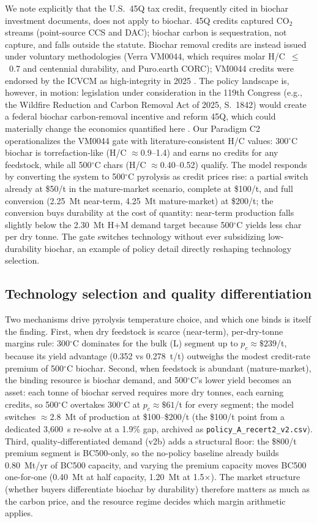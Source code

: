 We note explicitly that the U.S.~45Q tax credit, frequently cited in biochar
investment documents, does not apply to biochar. 45Q credits captured
CO$_2$ streams (point-source CCS and DAC); biochar carbon is sequestration, not
capture, and falls outside the statute. Biochar removal credits are instead
issued under voluntary methodologies (Verra VM0044, which requires molar
H/C~$\le$~0.7 and centennial durability, and Puro.earth CORC); VM0044 credits
were endorsed by the ICVCM as high-integrity in 2025 \cite{icvcm2025}. The
policy landscape is, however, in motion: legislation under consideration in the
119th Congress (e.g., the Wildfire Reduction and Carbon Removal Act of 2025,
S.~1842) would create a federal biochar carbon-removal incentive and reform
45Q, which could materially change the economics quantified here
\cite{wrca2025}. Our Paradigm C2 operationalizes the VM0044 gate with
literature-consistent H/C values: 300$^\circ$C biochar is torrefaction-like
(H/C $\approx$0.9--1.4) and earns no credits for any feedstock, while
all 500$^\circ$C chars (H/C $\approx$0.40--0.52) qualify. The model responds
by converting the system to 500$^\circ$C pyrolysis as credit prices rise: a
partial switch already at \$50/t in the mature-market scenario, complete at
\$100/t, and full conversion (2.25~Mt near-term, 4.25~Mt
mature-market) at \$200/t; the conversion
buys durability at the cost of quantity: near-term production falls slightly
below the 2.30~Mt H+M demand target because 500$^\circ$C yields less char per
dry tonne. The gate switches technology without ever subsidizing
low-durability biochar, an example of
policy detail directly reshaping technology selection.

\subsection{Technology selection and quality differentiation}

Two mechanisms drive pyrolysis temperature choice, and which one binds is
itself the finding. First, when dry feedstock is scarce (near-term), per-dry-tonne
margins rule: 300$^\circ$C dominates for the bulk (L) segment up to
$p_c\approx\$239$/t, because its yield advantage (0.352 vs 0.278~t/t)
outweighs the modest credit-rate premium of 500$^\circ$C biochar. Second, when
feedstock is abundant (mature-market), the binding resource is biochar demand,
and 500$^\circ$C's lower yield becomes an asset: each tonne of biochar
served requires more dry tonnes, each earning credits, so 500$^\circ$C overtakes
300$^\circ$C at $p_c\approx\$61$/t for every segment; the model switches
$\approx$2.8~Mt of production at \$100--\$200/t (the \$100/t point from a
dedicated 3{,}600~s re-solve at a 1.9\% gap, archived as
\texttt{policy\_A\_recert2\_v2.csv}). Third, quality-differentiated
demand (v2b) adds a structural floor: the \$800/t premium segment is BC500-only,
so the no-policy baseline already builds 0.80~Mt/yr of BC500 capacity, and
varying the premium capacity moves BC500 one-for-one (0.40~Mt at half capacity,
1.20~Mt at 1.5$\times$). The market structure (whether buyers differentiate
biochar by durability) therefore matters as much as the carbon price, and the
resource regime decides which margin arithmetic applies.


